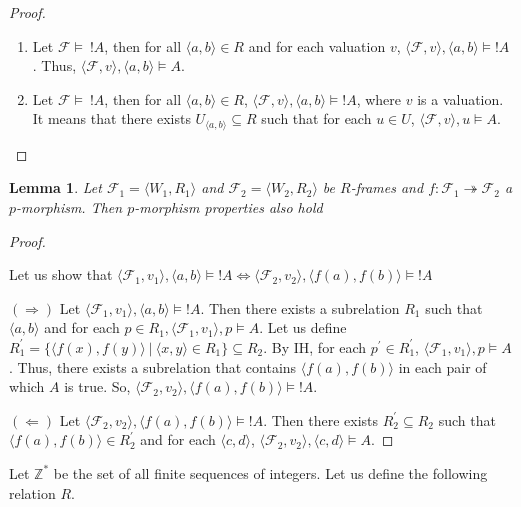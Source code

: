 \documentclass[a4paper]{article}
\theoremstyle{defin}
\theoremstyle{theorem}
\theoremstyle{prop}
\theoremstyle{lemma}
\newtheorem{lemma}{Lemma}
\theoremstyle{ex}
\theoremstyle{col}
\begin{document}
\begin{proof}

  \begin{enumerate}
    \item Let $\mathcal{F} \models \: ! A$, then for all $\langle a, b \rangle \in R$ and for each valuation $v$,
    $\langle \mathcal{F}, v \rangle, \langle a, b \rangle \models ! A$. Thus, $\langle \mathcal{F}, v \rangle, \langle a, b \rangle \models A$.
    \item Let $\mathcal{F} \models \: ! A$, then for all $\langle a, b \rangle \in R$, $\langle \mathcal{F}, v \rangle, \langle a, b \rangle \models ! A$,
    where $v$ is a valuation. It means that there exists $U_{\langle a, b \rangle} \subseteq R$ such that for each $u \in U$,
    $\langle \mathcal{F}, v \rangle, u \models A$.
  \end{enumerate}
\end{proof}

\begin{lemma}
  Let $\mathcal{F}_1 = \langle W_1, R_1 \rangle$ and $\mathcal{F}_2 = \langle W_2, R_2 \rangle$ be $R$-frames and $f : \mathcal{F}_1 \twoheadrightarrow \mathcal{F}_2$ a $p$-morphism. Then $p$-morphism properties also hold
\end{lemma}

\begin{proof}
  $ $

  Let us show that $\langle \mathcal{F}_1, v_1 \rangle, \langle a, b \rangle \models ! A \Leftrightarrow \langle \mathcal{F}_2, v_2 \rangle, \langle f(a), f(b) \rangle \models ! A$

    $(\Rightarrow)$ Let $\langle \mathcal{F}_1, v_1 \rangle, \langle a, b \rangle \models ! A$. Then there exists a subrelation $R_1$ such that $\langle a, b \rangle$ and
    for each $p \in R_1, \langle \mathcal{F}_1, v_1 \rangle, p \models A$.
    Let us define $R_1^{'} = \{ \langle f(x), f(y) \rangle \: | \: \langle x, y \rangle \in R_1 \} \subseteq R_2$. By IH, for each $p^{'} \in R_1^{'}$,
    $\langle \mathcal{F}_1, v_1 \rangle, p \models A$. Thus, there exists a subrelation that contains $\langle f(a), f(b) \rangle$ in each pair of which $A$ is true. So, $\langle \mathcal{F}_2, v_2 \rangle, \langle f(a), f(b) \rangle \models ! A$.

    $(\Leftarrow)$ Let $\langle \mathcal{F}_2, v_2 \rangle, \langle f(a), f(b) \rangle \models ! A$. Then there exists $R_2^{'} \subseteq R_2$ such that $\langle f(a), f(b) \rangle \in R_2^{'}$ and for each $\langle c, d \rangle$, $\langle \mathcal{F}_2, v_2 \rangle, \langle c, d \rangle \models A$.

    
\end{proof}

Let $\mathbb{Z}^{*}$ be the set of all finite sequences of integers. Let us define the following relation $R$.
\end{document}
